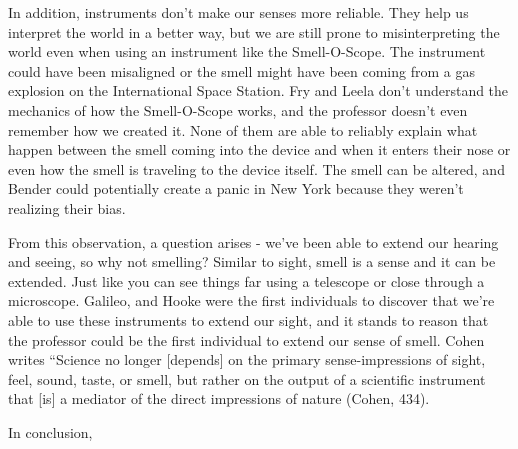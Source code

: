 \documentclass[11pt, oneside]{article}
\begin{document}
\par In addition, instruments don't make our senses more reliable. They help us interpret the world in a better way, but we are still prone to misinterpreting the world even when using an instrument like the Smell-O-Scope. The instrument could have been misaligned or the smell might have been coming from a gas explosion on the International Space Station. Fry and Leela don't understand the mechanics of how the Smell-O-Scope works, and the professor doesn't even remember how we created it. None of them are able to reliably explain what happen between the smell coming into the device and when it enters their nose or even how the smell is traveling to the device itself. The smell can be altered, and Bender could potentially create a panic in New York because they weren't realizing their bias.

\par From this observation, a question arises - we've been able to extend our hearing and seeing, so why not smelling? Similar to sight, smell is a sense and it can be extended. Just like you can see things far using a telescope or close through a microscope. Galileo, and Hooke were the first individuals to discover that we're able to use these instruments to extend our sight, and it stands to reason that the professor could be the first individual to extend our sense of smell. Cohen writes ``Science no longer [depends] on the primary sense-impressions of sight, feel, sound, taste, or smell, but rather on the output of a scientific instrument that [is] a mediator of the direct impressions of nature (Cohen, 434).

\par In conclusion, 
\end{document}
